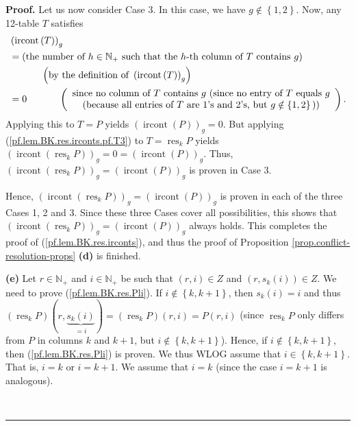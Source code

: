 \documentclass[numbers=enddot,12pt,final,onecolumn,notitlepage]{scrartcl}%
\theoremstyle{definition}
\newenvironment{proof}[1][Proof]{\noindent\textbf{#1.} }{\ \rule{0.5em}{0.5em}}
\newenvironment{verlong}{}{}
\begin{document}
\begin{verlong}
\begin{proof}
Let us now consider Case 3. In this case, we have $g\notin\left\{
1,2\right\}  $. Now, any 12-table $T$ satisfies%
\begin{align}
&  \left(  \operatorname*{ircont}\left(  T\right)  \right)  _{g}\nonumber\\
&  =\left(  \text{the number of }h\in\mathbb{N}_{+}\text{ such that the
}h\text{-th column of }T\text{ contains }g\right) \nonumber\\
&  \ \ \ \ \ \ \ \ \ \ \left(  \text{by the definition of }\left(
\operatorname*{ircont}\left(  T\right)  \right)  _{g}\right) \nonumber\\
&  =0\ \ \ \ \ \ \ \ \ \ \left(
\begin{array}
[c]{c}%
\text{since no column of }T\text{ contains }g\text{ (since no entry of
}T\text{ equals }g\\
\text{(because all entries of }T\text{ are }1\text{'s and }2\text{'s, but
}g\notin\left\{  1,2\right\}  \text{))}%
\end{array}
\right)  . \label{pf.lem.BK.res.irconts.pf.T3}%
\end{align}
Applying this to $T=P$ yields $\left(  \operatorname*{ircont}\left(  P\right)
\right)  _{g}=0$. But applying (\ref{pf.lem.BK.res.irconts.pf.T3}) to
$T=\operatorname*{res}\nolimits_{k}P$ yields $\left(  \operatorname*{ircont}%
\left(  \operatorname*{res}\nolimits_{k}P\right)  \right)  _{g}=0=\left(
\operatorname*{ircont}\left(  P\right)  \right)  _{g}$. Thus, $\left(
\operatorname*{ircont}\left(  \operatorname*{res}\nolimits_{k}P\right)
\right)  _{g}=\left(  \operatorname*{ircont}\left(  P\right)  \right)  _{g}$
is proven in Case 3.

Hence, $\left(  \operatorname*{ircont}\left(  \operatorname*{res}%
\nolimits_{k}P\right)  \right)  _{g}=\left(  \operatorname*{ircont}\left(
P\right)  \right)  _{g}$ is proven in each of the three Cases 1, 2 and 3.
Since these three Cases cover all possibilities, this shows that $\left(
\operatorname*{ircont}\left(  \operatorname*{res}\nolimits_{k}P\right)
\right)  _{g}=\left(  \operatorname*{ircont}\left(  P\right)  \right)  _{g}$
always holds. This completes the proof of (\ref{pf.lem.BK.res.irconts}), and
thus the proof of Proposition \ref{prop.conflict-resolution-props}
\textbf{(d)} is finished.

\textbf{(e)} Let $r\in\mathbb{N}_{+}$ and $i\in\mathbb{N}_{+}$ be such that
$\left(  r,i\right)  \in Z$ and $\left(  r,s_{k}\left(  i\right)  \right)  \in
Z$. We need to prove (\ref{pf.lem.BK.res.Pli}). If $i\notin\left\{
k,k+1\right\}  $, then $s_{k}\left(  i\right)  =i$ and thus $\left(
\operatorname*{res}\nolimits_{k}P\right)  \left(  r,\underbrace{s_{k}\left(
i\right)  }_{=i}\right)  =\left(  \operatorname*{res}\nolimits_{k}P\right)
\left(  r,i\right)  =P\left(  r,i\right)  $ (since $\operatorname*{res}%
\nolimits_{k}P$ only differs from $P$ in columns $k$ and $k+1$, but
$i\notin\left\{  k,k+1\right\}  $). Hence, if $i\notin\left\{  k,k+1\right\}
$, then (\ref{pf.lem.BK.res.Pli}) is proven. We thus WLOG assume that
$i\in\left\{  k,k+1\right\}  $. That is, $i=k$ or $i=k+1$. We assume that
$i=k$ (since the case $i=k+1$ is analogous).


\end{proof}
\end{verlong}
\end{document}
